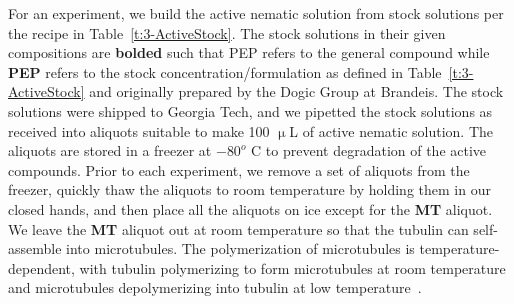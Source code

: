 For an experiment, we build the active nematic solution from stock solutions per the recipe in Table~\ref{t:3-ActiveStock}.
The stock solutions in their given compositions are {\bf bolded} such that PEP refers to the general compound while {\bf PEP} refers to the stock concentration/formulation as defined in Table~\ref{t:3-ActiveStock} and originally prepared by the Dogic Group at Brandeis.
The stock solutions were  shipped to Georgia Tech, and we pipetted the stock solutions as received into aliquots suitable to make 100 $\upmu$L of active nematic solution.
The aliquots are stored in a freezer at $-80^o$ C to prevent degradation of the active compounds.
Prior to each experiment, we remove a set of aliquots from the freezer, quickly thaw the aliquots to room temperature by holding them in our closed hands, and then place all the aliquots on ice except for the {\bf MT} aliquot.
We leave the {\bf MT} aliquot out at room temperature so that the tubulin can self-assemble into microtubules.
The polymerization of microtubules is temperature-dependent, with tubulin polymerizing to form microtubules at room temperature and microtubules depolymerizing into tubulin at low temperature~\cite{RN3}.

